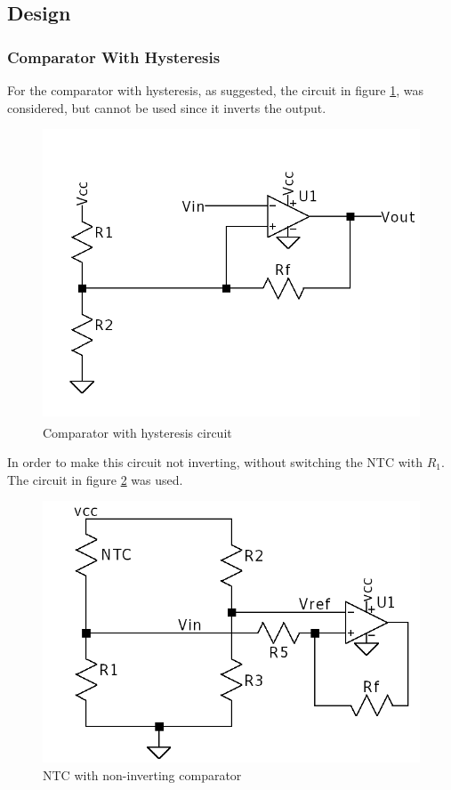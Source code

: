 \subsection{Design}
\subsubsection{Comparator With Hysteresis}

For the comparator with hysteresis, as suggested, the circuit in figure \ref{fig:ComparatorCirc}, was considered, but cannot be used since it inverts the output.

\begin{figure}[H]
    \centering
    \includegraphics*[scale = 0.5]{Images/SingleSupplySchimidtTrigger.png}
    \caption{Comparator with hysteresis circuit \textsuperscript{\cite{NTC_datasheet}}}
    \label{fig:ComparatorCirc}
\end{figure}

In order to make this circuit not inverting, without switching the NTC with $R_{1}$. The circuit in figure \ref{fig:NTCCirc} was used.

\begin{figure}[H]
    \centering
    \includegraphics*[scale = 0.5]{Images/NTCCirc.png}
    \caption{NTC with non-inverting comparator}
    \label{fig:NTCCirc}
\end{figure}

